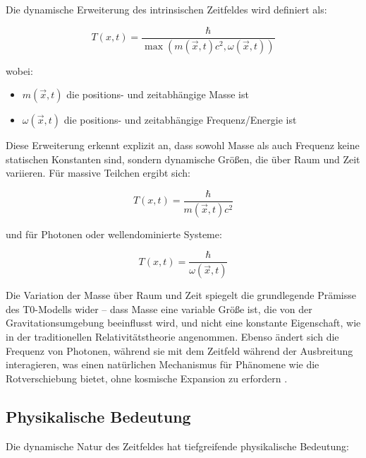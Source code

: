 \documentclass[12pt,a4paper]{article}
\newcommand{\Tfieldt}{T(x,t)}
\newcommand{\vecx}{\vec{x}}
\begin{document}
	Die dynamische Erweiterung des intrinsischen Zeitfeldes wird definiert als:
	
	\begin{equation}
		\Tfieldt = \frac{\hbar}{\max(m(\vecx,t)c^2, \omega(\vecx,t))}
		\label{eq:dynamic_time_field}
	\end{equation}
	
	wobei:
	\begin{itemize}
		\item $m(\vecx,t)$ die positions- und zeitabhängige Masse ist
		\item $\omega(\vecx,t)$ die positions- und zeitabhängige Frequenz/Energie ist
	\end{itemize}
	
	Diese Erweiterung erkennt explizit an, dass sowohl Masse als auch Frequenz keine statischen Konstanten sind, sondern dynamische Größen, die über Raum und Zeit variieren. Für massive Teilchen ergibt sich:
	
	\begin{equation}
		\Tfieldt = \frac{\hbar}{m(\vecx,t)c^2}
		\label{eq:massive_dynamic}
	\end{equation}
	
	und für Photonen oder wellendominierte Systeme:
	
	\begin{equation}
		\Tfieldt = \frac{\hbar}{\omega(\vecx,t)}
		\label{eq:photon_dynamic}
	\end{equation}
	
	Die Variation der Masse über Raum und Zeit spiegelt die grundlegende Prämisse des T0-Modells wider – dass Masse eine variable Größe ist, die von der Gravitationsumgebung beeinflusst wird, und nicht eine konstante Eigenschaft, wie in der traditionellen Relativitätstheorie angenommen. Ebenso ändert sich die Frequenz von Photonen, während sie mit dem Zeitfeld während der Ausbreitung interagieren, was einen natürlichen Mechanismus für Phänomene wie die Rotverschiebung bietet, ohne kosmische Expansion zu erfordern \cite{pascher_part2_2025}.
	
	\subsection{Physikalische Bedeutung}
	\label{subsec:physical_significance}
	
	Die dynamische Natur des Zeitfeldes hat tiefgreifende physikalische Bedeutung:
	
\end{document}
